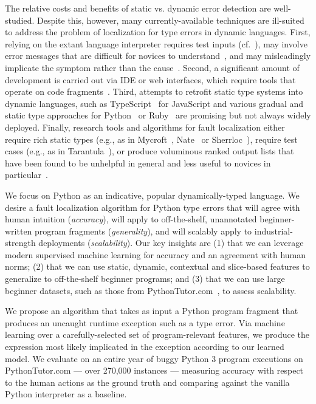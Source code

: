 \documentclass[conference]{IEEEtran}
\begin{document}
The relative costs and benefits of static vs. dynamic error detection are
well-studied. Despite this, however, many currently-available techniques
are ill-suited to address the problem of localization for type errors in
dynamic languages. First, relying on the extant language interpreter
requires test inputs
(cf.~\cite{Godefroid2005-am,Naylor2007-mi,Cadar2008-kg,PAcheco2007-at}),
may involve error messages that are difficult for novices to
understand~\cite{Marceau2011-ok,Marceau2011-cy,Nienaltowski2008-bv,Jadud2006-ly,Ishii2014-nf},
and may misleadingly implicate the symptom rather than the
cause~\cite{zeller05,Jose2011}.  Second, a
significant amount of development is carried out via IDE or web interfaces,
which require tools that operate on code fragments~\cite{Guo2013-vu}.
Third, attempts to retrofit static type systems into dynamic languages,
such as TypeScript~\cite{typescript2014,refscriptpldi16,mollerOOPSLA14} for
JavaScript and various
gradual and static type approaches for
Python~\cite{mypy,gradual-typing-python} or
Ruby~\cite{static-typing-ruby,an11,foster09,foster11}
are promising but not always widely
deployed. Finally, research tools and algorithms for fault
localization either require rich static types (e.g., as in
Mycroft~\cite{MYCROFT-type-errors}, Nate~\cite{learning-to-blame} or Sherrloc~\cite{SHErrLoc}), require
test cases (e.g., as in Tarantula~\cite{tarantula}), or produce voluminous
ranked output lists that have been found to be unhelpful in general and
less useful to novices in particular~\cite[Sec.~5.1]{orso-parnin}.

We focus on Python as an indicative, popular dynamically-typed language.
We desire a fault localization algorithm for Python type errors that
will agree with human intuition (\emph{accuracy}), will apply to
off-the-shelf, unannotated beginner-written program fragments
(\emph{generality}), and will scalably apply to industrial-strength
deployments (\emph{scalability}). Our key insights are (1) that we can leverage
modern supervised machine learning for accuracy and an agreement with human
norms; (2) that we can use static, dynamic, contextual and slice-based
features to generalize to off-the-shelf beginner programs; and (3) that we
can use large beginner datasets, such as those from
PythonTutor.com~\cite{Guo2013-vu}, to assess scalability.

We propose an algorithm that takes as input a Python program fragment that
produces an uncaught runtime exception such as a type error. Via machine
learning over a carefully-selected set of program-relevant features, we
produce the expression most likely implicated in the exception according to
our learned model. We evaluate on an entire year of buggy Python 3 program
executions on PythonTutor.com --- over 270,000 instances --- measuring
accuracy with respect to the human actions as the ground truth and
comparing against the vanilla Python interpreter as a baseline.
\end{document}
